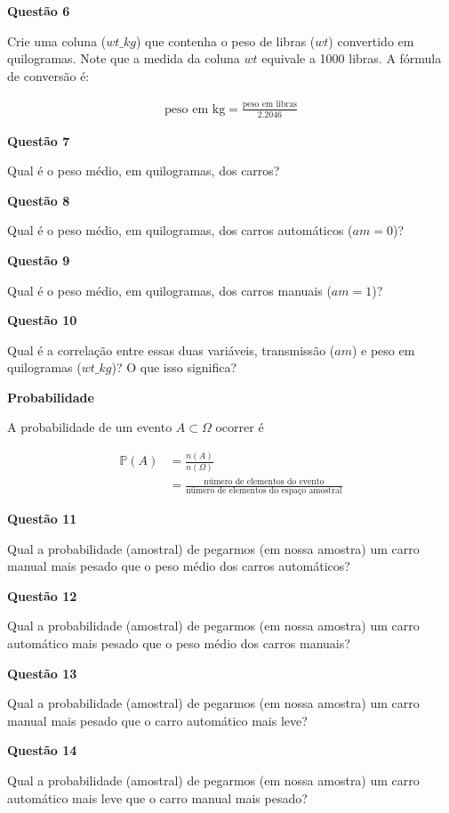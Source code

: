 \documentclass[12pt, a4paper]{article}
\begin{document}
\textbf{Questão 6}

Crie uma coluna ($wt\_kg$) que contenha o peso de libras ($wt$) convertido em quilogramas. Note que a medida da coluna $wt$ equivale a 1000 libras. A fórmula de conversão é:

\begin{align*}
	\text{peso em kg} = \frac{\text{peso em libras}}{2.2046}
\end{align*}



\textbf{Questão 7}

Qual é o peso médio, em quilogramas, dos carros?



\textbf{Questão 8}

Qual é o peso médio, em quilogramas, dos carros automáticos ($am = 0$)?



\textbf{Questão 9}

Qual é o peso médio, em quilogramas, dos carros manuais ($am = 1$)?



\textbf{Questão 10}

Qual é a correlação entre essas duas variáveis, transmissão ($am$) e peso em quilogramas ($wt\_kg$)? O que isso significa?


\textbf{Probabilidade}

A probabilidade de um evento $A \subset \Omega$ ocorrer é

\begin{align*}
	\mathbb{P}(A) &= \frac{n(A)}{n(\Omega)}\\
	&= \frac{\text{número de elementos do evento}}{\text{número de elementos do espaço amostral}}
\end{align*}

\textbf{Questão 11}

Qual a probabilidade (amostral) de pegarmos (em nossa amostra) um carro manual mais pesado que o peso médio dos carros automáticos?



\textbf{Questão 12}

Qual a probabilidade (amostral) de pegarmos (em nossa amostra) um carro automático mais pesado que o peso médio dos carros manuais?



\textbf{Questão 13}

Qual a probabilidade (amostral) de pegarmos (em nossa amostra) um carro manual mais pesado que o carro automático mais leve?



\textbf{Questão 14}

Qual a probabilidade (amostral) de pegarmos (em nossa amostra) um carro automático mais leve que o carro manual mais pesado?




	
\end{document}
